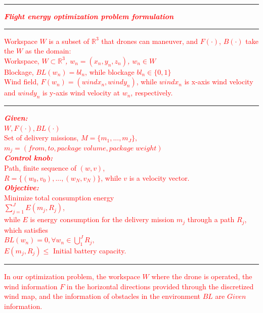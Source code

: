 \documentclass[onecolumn]{IEEEconf}
\begin{document}
\begin{description}
\begin{mdframed}[ linewidth=.75pt, userdefinedwidth=0.9\textwidth]
    \textcolor{red}{
    \vspace{7pt}
    \hrule
    \vspace{5pt}
    \noindent\textit{\textbf{Flight energy optimization problem formulation}}
    \vspace{5pt}
    \hrule
    \vspace{5pt}
    \noindent Workspace $W$ is a subset of $\mathbb{R}^3$ that drones can maneuver, and $F(\cdot)$, $B(\cdot)$ take the $W$ as the domain:\\
    \indent Workspace, \textit{$W\subset\mathbb{R}^3$, $w_n=(x_n,y_n,z_n)$, $w_n \in W$ }\\
    \indent Blockage, \textit{$BL(w_n)=bl_n$}, while blockage $bl_n\in\{0,1\}$\\
    \indent Wind field, \textit{$F(w_n) = (windx_n, windy_n)$}, while $windx_n$ is  
    x-axis wind velocity and $windy_n$ is y-axis wind velocity
    at $w_n$, respectively.
    \vspace{5pt}
    \hrule
    \vspace{5pt}
    \noindent\textit{\textbf{Given:}}~\\
    \indent $W, F(\cdot), BL(\cdot)$~\\
    \indent Set of delivery missions, $M = \{m_1, ..., m_J\},$~\\ 
    \indent $m_j = (from, to, package\;volume, package\;weight)$~\\
    \noindent\textit{\textbf{Control knob:}}~\\
    \indent Path, finite sequence of $(w,v)$,~\\
    \indent $R = \{(w_0,v_0), ..., (w_N,v_N)\}$, while $v$ is a velocity vector.
    ~\\
    \noindent\textit{\textbf{Objective:}}~\\ 
    \indent Minimize total consumption energy~\\
    \indent\indent $\sum_{j=1}^J E(m_j,R_j)$,~\\
    \indent while $E$ is energy consumption for the delivery mission $m_j$ through a path $R_j$, which satisfies~\\
    \indent\indent $BL(w_n) = 0, \forall w_n \in \bigcup_{1}^J R_j,$~\\
    \indent\indent $E(m_j, R_j) \leq$ Initial battery capacity.
    \vspace{5pt}
    \hrule
    \vspace{5pt}
    }
    \vspace{5pt}
    \textcolor{red}{In our optimization problem, the workspace $W$ where the drone is operated, the wind information $F$ in the horizontal directions provided through the discretized wind map, and the information of obstacles in the environment $BL$ are $Given$ information.
}
\end{mdframed}
\end{description}
\end{document}
